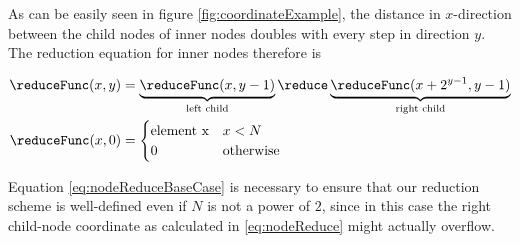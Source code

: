 As can be easily seen in figure \ref{fig:coordinateExample}, the distance in $x$-direction between the child nodes of inner nodes doubles
with every step in direction $y$. The reduction equation for inner nodes therefore is

\begin{align}
\reduceFunc (x, y) &= \underbrace{\reduceFunc (x, y - 1)}_{\textrm{left child}}
\reduce \underbrace{\reduceFunc (x + 2^{y - 1}, y - 1)}_{\textrm{right child}} \label{eq:nodeReduce} \\
\reduceFunc (x, 0) &= \begin{cases}
\textrm{element x} & x < N \\
0 & \textrm{otherwise}
\end{cases}
\label{eq:nodeReduceBaseCase}
\end{align}

Equation \eqref{eq:nodeReduceBaseCase} is necessary to ensure that our reduction scheme is well-defined even if $N$ is not a power of $2$,
since in this case the right child-node coordinate as calculated in \eqref{eq:nodeReduce} might actually overflow.

